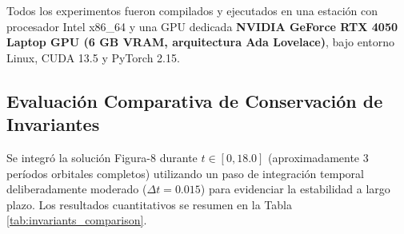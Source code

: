 \documentclass[11pt,a4paper]{article}
\begin{document}
Todos los experimentos fueron compilados y ejecutados en una estación con procesador Intel x86\_64 y una GPU dedicada \textbf{NVIDIA GeForce RTX 4050 Laptop GPU (6 GB VRAM, arquitectura Ada Lovelace)}, bajo entorno Linux, CUDA 13.5 y PyTorch 2.15.

\subsection{Evaluación Comparativa de Conservación de Invariantes}
Se integró la solución Figura-8 durante $t \in [0, 18.0]$ (aproximadamente 3 períodos orbitales completos) utilizando un paso de integración temporal deliberadamente moderado ($\Delta t = 0.015$) para evidenciar la estabilidad a largo plazo. Los resultados cuantitativos se resumen en la Tabla \ref{tab:invariants_comparison}.

\begin{table}[H]
\centering
\small
\caption{Comparativa cuantitativa de conservación de invariantes y eficiencia en la órbita Figura-8 ($t \in [0, 18.0]$).}
\label{tab:invariants_comparison}
\end{table}
\end{document}
